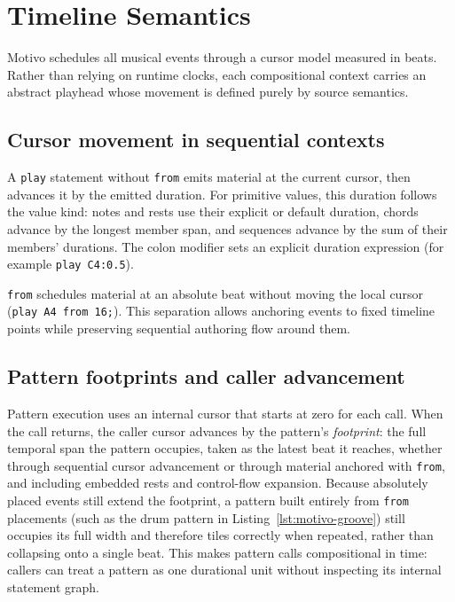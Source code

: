 \section{Timeline Semantics}\label{sec:temporal-model}

Motivo schedules all musical events through a cursor model measured in beats.
Rather than relying on runtime clocks, each compositional context carries an abstract playhead whose movement is defined
purely by source semantics.

\subsection{Cursor movement in sequential contexts}

A \texttt{play} statement without \texttt{from} emits material at the current cursor, then advances it by the emitted
duration.
For primitive values, this duration follows the value kind:
notes and rests use their explicit or default duration, chords advance by the longest member span, and sequences advance
by the sum of their members' durations.
The colon modifier sets an explicit duration expression (for example \texttt{play C4:0.5}).

\texttt{from} schedules material at an absolute beat without moving the local cursor (\texttt{play A4 from 16;}).
This separation allows anchoring events to fixed timeline points while preserving sequential authoring flow around them.

\subsection{Pattern footprints and caller advancement}

Pattern execution uses an internal cursor that starts at zero for each call.
When the call returns, the caller cursor advances by the pattern's \emph{footprint}: the full temporal span the pattern
occupies, taken as the latest beat it reaches, whether through sequential cursor advancement or through material
anchored with \texttt{from}, and including embedded rests and control-flow expansion.
Because absolutely placed events still extend the footprint, a pattern built entirely from \texttt{from} placements
(such as the drum pattern in Listing~\ref{lst:motivo-groove}) still occupies its full width and therefore tiles
correctly when repeated, rather than collapsing onto a single beat.
This makes pattern calls compositional in time: callers can treat a pattern as one durational unit without inspecting
its internal statement graph.

